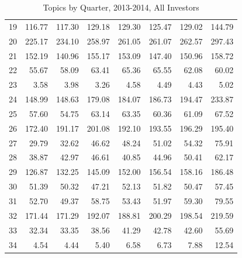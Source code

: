 \begin{table}[]
\begin{tabular}{l|rrrrrrr}
		19 & 116.77 & 117.30 & 129.18 & 129.30 & 125.47 & 129.02 & 144.79 \\
		20 & 225.17 & 234.10 & 258.97 & 261.05 & 261.07 & 262.57 & 297.43 \\
		21 & 152.19 & 140.96 & 155.17 & 153.09 & 147.40 & 150.96 & 158.72 \\
		22 & 55.67 & 58.09 & 63.41 & 65.36 & 65.55 & 62.08 & 60.02 \\
		23 & 3.58 & 3.98 & 3.26 & 4.58 & 4.49 & 4.43 & 5.02 \\
		24 & 148.99 & 148.63 & 179.08 & 184.07 & 186.73 & 194.47 & 233.87 \\
		25 & 57.60 & 54.75 & 63.14 & 63.35 & 60.36 & 61.09 & 67.52 \\
		26 & 172.40 & 191.17 & 201.08 & 192.10 & 193.55 & 196.29 & 195.40 \\
		27 & 29.79 & 32.62 & 46.62 & 48.24 & 51.02 & 54.32 & 75.91 \\
		28 & 38.87 & 42.97 & 46.61 & 40.85 & 44.96 & 50.41 & 62.17 \\
		29 & 126.87 & 132.25 & 145.09 & 152.00 & 156.54 & 158.16 & 186.48 \\
		30 & 51.39 & 50.32 & 47.21 & 52.13 & 51.82 & 50.47 & 57.45 \\
		31 & 52.70 & 49.37 & 58.75 & 53.43 & 51.97 & 59.30 & 79.55 \\
		32 & 171.44 & 171.29 & 192.07 & 188.81 & 200.29 & 198.54 & 219.59 \\
		33 & 32.34 & 33.35 & 38.56 & 41.29 & 42.78 & 42.60 & 55.69 \\
		34 & 4.54 & 4.44 & 5.40 & 6.58 & 6.73 & 7.88 & 12.54
	\end{tabular}
\caption[Topics by Quarter, 2013-2014, All Investors]{Topics by Quarter, 2013-2014, All Investors}
\label{tab:Topics_investors_2013-2014}
\end{table}


